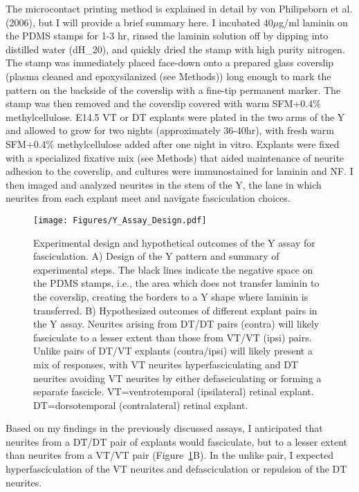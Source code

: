 The microcontact printing method is explained in detail by von Philipsborn et al. (2006), but I will provide a brief summary here.
I incubated 40$\mu$g/ml laminin on the PDMS stamps for 1-3 hr, rinsed the laminin solution off by dipping into distilled water (dH_20), and quickly dried the stamp with high purity nitrogen.
The stamp was immediately placed face-down onto a prepared glass coverslip (plasma cleaned and epoxysilanized (see Methods)) long enough to mark the pattern on the backside of the coverslip with a fine-tip permanent marker.
The stamp was then removed and the coverslip covered with warm SFM+0.4\% methylcellulose.
E14.5 VT or DT explants were plated in the two arms of the Y and allowed to grow for two nights (approximately 36-40hr), with fresh warm SFM+0.4\% methylcellulose added after one night in vitro.
Explants were fixed with a specialized fixative mix (see Methods) that aided maintenance of neurite adhesion to the coverslip, and cultures were immunostained for laminin and NF.
I then imaged and analyzed neurites in the stem of the Y, the lane in which neurites from each explant meet and navigate fasciculation choices.
\begin{figure}[hbtp]
    \begin{center}
        \texttt{[image: Figures/Y\_Assay\_Design.pdf]}
        \caption[Experimental design and hypothetical outcomes of the Y assay for fasciculation.]
        {Experimental design and hypothetical outcomes of the Y assay for fasciculation.
		A) Design of the Y pattern and summary of experimental steps.
		The black lines indicate the negative space on the PDMS stamps, i.e., the area which does not transfer laminin to the coverslip, creating the borders to a Y shape where laminin is transferred.
		B) Hypothesized outcomes of different explant pairs in the Y assay.
		Neurites arising from DT/DT pairs (contra) will likely fasciculate to a lesser extent than those from VT/VT (ipsi) pairs.
		Unlike pairs of DT/VT explants (contra/ipsi) will likely present a mix of responses, with VT neurites hyperfasciculating and DT neurites avoiding VT neurites by either defasciculating or forming a separate fascicle.
		VT=ventrotemporal (ipsilateral) retinal explant.
		DT=dorsotemporal (contralateral) retinal explant.
		}
        \label{Figures/Y_Assay_Design}
    \end{center}
\end{figure}
Based on my findings in the previously discussed assays, I anticipated that neurites from a DT/DT pair of explants would fasciculate, but to a lesser extent than neurites from a VT/VT pair (Figure~\ref{Figures/Y_Assay_Design}B).
In the unlike pair, I expected hyperfasciculation of the VT neurites and defasciculation or repulsion of the DT neurites.


